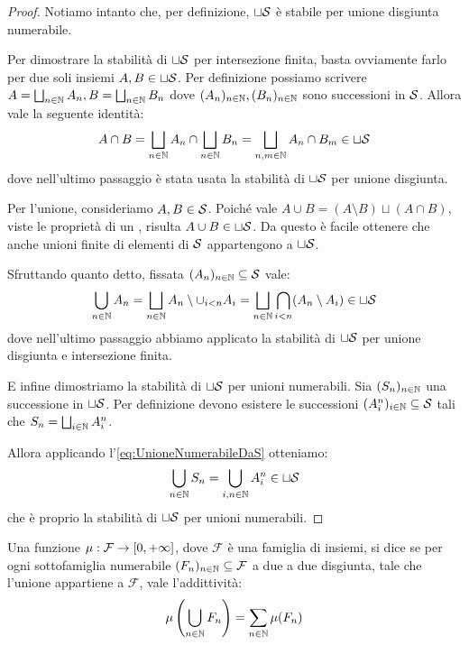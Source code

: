 \begin{proof}
	Notiamo intanto che, per definizione, $\sqcup\S$ è stabile per unione disgiunta numerabile.
	
	Per dimostrare la stabilità di $\sqcup\S$ per intersezione finita, basta ovviamente farlo per due soli insiemi $A,B\in\sqcup\S$. Per definizione possiamo scrivere $A=\bigsqcup_{n\in\N} A_n, B=\bigsqcup_{n\in\N} B_n$ dove $(A_n)_{n\in\N},(B_n)_{n\in\N}$ sono successioni in $\S$. Allora vale la seguente identità:
	\begin{equation*}
		A\cap B=\bigsqcup_{n\in\N} A_n\cap\bigsqcup_{n\in\N} B_n=
		\bigsqcup_{n,m\in\N} A_n\cap B_m\in\sqcup\S
	\end{equation*}
	dove nell'ultimo passaggio è stata usata la stabilità di $\sqcup\S$ per unione disgiunta.
	
	Per l'unione, consideriamo $A,B\in\S$. Poiché vale $A\cup B=(A\setminus B)\sqcup(A\cap B)$, viste le proprietà di un \semiring{}, risulta $A\cup B\in \sqcup\S$. Da questo è facile ottenere che anche unioni finite di elementi di $\S$ appartengono a $\sqcup\S$.
	
	Sfruttando quanto detto, fissata $(A_n)_{n\in\N}\subseteq\S$ vale:
	\begin{equation}\label{eq:UnioneNumerabileDaS}
		\bigcup_{n\in\N} A_n=\bigsqcup_{n\in\N} A_n\setminus\cup_{i<n} A_i
		=\bigsqcup_{n\in\N} \bigcap_{i<n} (A_n\setminus A_i)\in\sqcup\S
	\end{equation}
	dove nell'ultimo passaggio abbiamo applicato la stabilità di $\sqcup\S$ per unione disgiunta e intersezione finita.
	
	E infine dimostriamo la stabilità di $\sqcup\S$ per unioni numerabili. Sia $(S_n)_{n\in\N}$ una successione in $\sqcup\S$. Per definizione devono esistere le successioni $(A^n_i)_{i\in\N}\subseteq \S$ tali che $S_n=\bigsqcup_{i\in\N} A^n_i$.
	
	Allora applicando l'\cref{eq:UnioneNumerabileDaS} otteniamo:
	\begin{equation*}
		\bigcup_{n\in\N}S_n=\bigcup_{i,n\in\N}A^n_i\in\sqcup\S 
	\end{equation*}
	che è proprio la stabilità di $\sqcup\S$ per unioni numerabili.
\end{proof}

\begin{definition}[{\sigadd[ità]}]
	Una funzione $\mu:\mathcal F\to \Rpiu$, dove $\mathcal F$ è una famiglia di insiemi, si dice \sigadd{} se per ogni sottofamiglia numerabile $(F_n)_{n\in\N}\subseteq \mathcal F$ a due a due disgiunta, tale che l'unione appartiene a $\mathcal F$, vale l'addittività:
	\begin{equation*}
		\mu\left(\bigcup_{n\in\N}F_n \right)=\sum_{n\in\N} \mu(F_n) 
	\end{equation*}
\end{definition}


